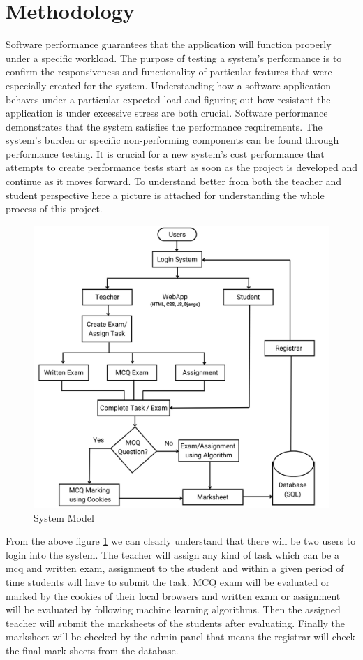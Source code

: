 \section{Methodology}
Software performance guarantees that the application will function properly under a specific workload. The purpose of testing a system's performance is to confirm the responsiveness and functionality of particular features that were especially created for the system. Understanding how a software application behaves under a particular expected load and figuring out how resistant the application is under excessive stress are both crucial. Software performance demonstrates that the system satisfies the performance requirements. The system's burden or specific non-performing components can be found through performance testing. It is crucial for a new system's cost performance that attempts to create performance tests start as soon as the project is developed and continue as it moves forward. To understand better from both the teacher and student perspective here a picture is attached for understanding the whole process of this project.
\begin{figure}[H]
    \centering
    \includegraphics[scale=.36]{img/system-diagram.png}
    \caption{System Model}
    \label{fig:System}
\end{figure}
From the above figure \ref{fig:System} we can clearly understand that there will be two users to login into the system. The teacher will assign any kind of task which can be a mcq and written exam, assignment to the student and within a given period of time students will have to submit the task. MCQ exam will be evaluated or marked by the cookies of their local browsers and written exam or assignment will be evaluated by following machine learning algorithms. Then the assigned teacher will submit the marksheets of the students after evaluating. Finally the marksheet will be checked by the admin panel that means the registrar will check the final mark sheets from the database. \\

